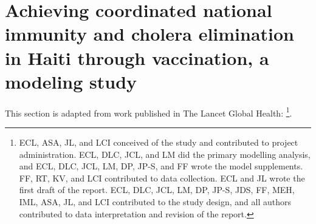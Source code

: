 \chapter{Achieving coordinated national immunity and cholera elimination in Haiti through vaccination, a modeling study}
\label{ch:cholera-haiti-ocv}

This section is adapted from work published in The Lancet Global Health:
\footnote{ECL, ASA, JL, and LCI conceived of the study and contributed to project administration. ECL, DLC, JCL, and LM did the primary modelling analysis, and ECL, DLC, JCL, LM, DP, JP-S, and FF wrote the model supplements. FF, RT, KV, and LCI contributed to data collection. ECL and JL wrote the first draft of the report. ECL, DLC, JCL, LM, DP, JP-S, JDS, FF, MEH, IML, ASA, JL, and LCI contributed to the study design, and all authors contributed to data interpretation and revision of the report.}. 

